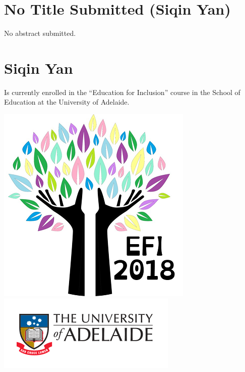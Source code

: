 \documentclass[twoside,14pt,a4paper,notitlepage]{memoir}
\begin{document}
\section*{No Title Submitted (Siqin Yan)}
\label{aut:yan}

No abstract submitted.

\section*{Siqin Yan}

Is currently enrolled in the ``Education for Inclusion'' course in the School of Education at the University of Adelaide.



\vfill
\includegraphics[scale=0.5]{colour_tree.png}
\hfill
\includegraphics[scale=1]{uoa-logo-col-horiz.png}
\end{document}

